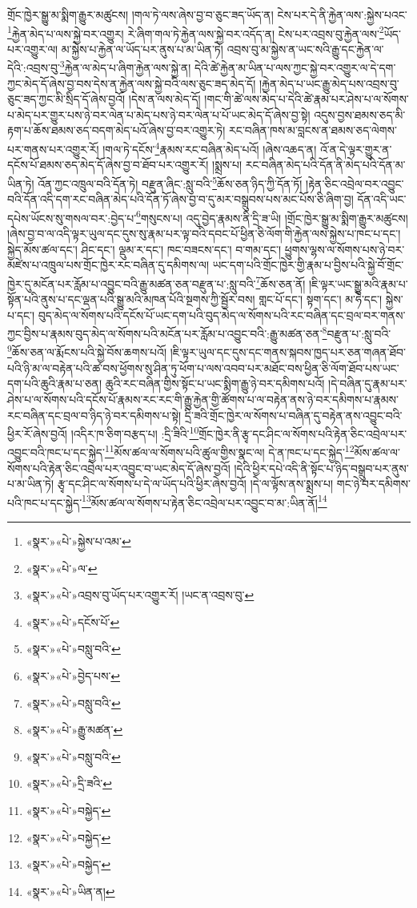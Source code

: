 གྲོང་ཁྱེར་སྒྱུ་མ་སྨིག་རྒྱུར་མཚུངས། །གལ་ཏེ་ལས་ཞེས་བྱ་བ་ཅུང་ཟད་ཡོད་ན། ངེས་པར་དེ་ནི་རྐྱེན་ལས་:སྐྱེས་པའང་\footnote{«སྣར་»«པེ་»སྐྱེས་པ་འམ་}རྐྱེན་མེད་པ་ལས་སྐྱེ་བར་འགྱུར། རེ་ཞིག་གལ་ཏེ་རྐྱེན་ལས་སྐྱེ་བར་འདོད་ན། ངེས་པར་འབྲས་བུ་རྐྱེན་ལས་\footnote{«སྣར་»«པེ་»ལ་}ཡོད་པར་འགྱུར་ལ། མ་སྐྱེས་པ་རྐྱེན་ལ་ཡོད་པར་ནུས་པ་མ་ཡིན་ཏེ། འབྲས་བུ་མ་སྐྱེས་ན་ཡང་སའི་རྒྱུ་དང་རྐྱེན་ལ་དེའི་:འབྲས་བུ་\footnote{«སྣར་»«པེ་»འབྲས་བུ་ཡོད་པར་འགྱུར་རོ། །ཡང་ན་འབྲས་བུ་}རྐྱེན་ལ་མེད་པ་ཞིག་རྐྱེན་ལས་སྐྱེ་ན། དེའི་ཚེ་རྐྱེན་མ་ཡིན་པ་ལས་ཀྱང་སྐྱེ་བར་འགྱུར་ལ་དེ་དག་ཀྱང་མེད་དོ་ཞེས་བྱ་བས་དེས་ན་རྐྱེན་ལས་སྐྱེ་བའི་ལས་ཅུང་ཟད་མེད་དོ། །རྐྱེན་མེད་པ་ཡང་རྒྱུ་མེད་པས་འབྲས་བུ་ཅུང་ཟད་ཀྱང་མི་སྲིད་དོ་ཞེས་བྱའོ། །དེས་ན་ལས་མེད་དོ། །གང་གི་ཚེ་ལས་མེད་པ་དེའི་ཚེ་རྣམ་པར་ཤེས་པ་ལ་སོགས་པ་མེད་པར་གྱུར་པས་ཉེ་བར་ལེན་པ་མེད་པས་ཉེ་བར་ལེན་པ་པོ་ཡང་མེད་དོ་ཞེས་བྱ་སྟེ། འདུས་བྱས་ཐམས་ཅད་མི་རྟག་པ་ཆོས་ཐམས་ཅད་བདག་མེད་པའོ་ཞེས་བྱ་བར་འགྱུར་ཏེ། རང་བཞིན་ཁས་མ་བླངས་ན་ཐམས་ཅད་ལེགས་པར་གནས་པར་འགྱུར་རོ། །གལ་ཏེ་དངོས་\footnote{«སྣར་»«པེ་»དངོས་པོ་}རྣམས་རང་བཞིན་མེད་པའོ། །ཞེས་འཆད་ན། འོ་ན་དེ་ལྟར་གྱུར་ན་དངོས་པོ་ཐམས་ཅད་མེད་དོ་ཞེས་བྱ་བ་ཐོབ་པར་འགྱུར་རོ། །སྨྲས་པ། རང་བཞིན་མེད་པའི་དོན་ནི་མེད་པའི་དོན་མ་ཡིན་ཏེ། འོན་ཀྱང་འཁྲུལ་བའི་དོན་ཏེ། བརྫུན་ཞིང་:སླུ་བའི་\footnote{«སྣར་»«པེ་»བསླུ་བའི་}ཆོས་ཅན་ཉིད་ཀྱི་དོན་ཏོ། །རྟེན་ཅིང་འབྲེལ་བར་འབྱུང་བའི་དོན་འདི་དག་རང་བཞིན་མེད་པའི་དོན་ཏོ་ཞེས་བྱ་བ་དུ་མར་བསྒྲུབས་པས་མང་པོས་ཅི་ཞིག་བྱ། དོན་འདི་ཡང་དཔེས་ཡོངས་སུ་གསལ་བར་:བྱེད་པ་\footnote{«སྣར་»«པེ་»བྱེད་པས་}གསུངས་པ། འདུ་བྱེད་རྣམས་ནི་དྲི་ཟ་ཡི། །གྲོང་ཁྱེར་སྒྱུ་མ་སྨིག་རྒྱུར་མཚུངས། །ཞེས་བྱ་བ་ལ་འདི་ལྟར་ཡུལ་དང་དུས་སུ་རྣམ་པར་ལྟ་བའི་དབང་པོ་ཕྱིན་ཅི་ལོག་གི་རྐྱེན་ལས་སྐྱེས་པ་ཁང་པ་དང་། སྐྱེད་མོས་ཚལ་དང་། ཤིང་དང་། ལྡུམ་ར་དང་། ཁང་བཟངས་དང་། བ་གམ་དང་། ཕྱུགས་ལྷས་ལ་སོགས་པས་ཉེ་བར་མཛེས་པ་འཁྲུལ་པས་གྲོང་ཁྱེར་རང་བཞིན་དུ་དམིགས་ལ། ཡང་དག་པའི་གྲོང་ཁྱེར་གྱི་རྣམ་པ་བྱིས་པའི་སྐྱེ་བོ་གྲོང་ཁྱེར་དུ་མངོན་པར་རློམ་པ་འབྱུང་བའི་རྒྱུ་མཚན་ཅན་བརྫུན་པ་:སླུ་བའི་\footnote{«སྣར་»«པེ་»བསླུ་བའི་}ཆོས་ཅན་ནོ། །ཇི་ལྟར་ཡང་སྒྱུ་མའི་རྣམ་པ་སྟོན་པའི་ནུས་པ་དང་ལྡན་པའི་སྒྱུ་མའི་མཁན་པོའི་སྔགས་ཀྱི་སྦྱོར་བས། གླང་པོ་དང་། སྟག་དང་། མ་ཧེ་དང་། སྐྱེས་པ་དང་། བུད་མེད་ལ་སོགས་པའི་དངོས་པོ་ཡང་དག་པའི་བུད་མེད་ལ་སོགས་པའི་རང་བཞིན་དང་བྲལ་བར་གནས་ཀྱང་བྱིས་པ་རྣམས་བུད་མེད་ལ་སོགས་པའི་མངོན་པར་རློམ་པ་འབྱུང་བའི་:རྒྱུ་མཚན་ཅན་\footnote{«སྣར་»«པེ་»རྒྱུ་མཚན་}བརྫུན་པ་:སླུ་བའི་\footnote{«སྣར་»«པེ་»བསླུ་བའི་}ཆོས་ཅན་ལ་རྨོངས་པའི་སྐྱེ་བོས་ཆགས་པའོ། །ཇི་ལྟར་ཡུལ་དང་དུས་དང་གནས་སྐབས་ཁྱད་པར་ཅན་གཞན་ཐོབ་པའི་ཉི་མ་ལ་བརྟེན་པའི་ཚ་བས་ཕྱོགས་སུ་ཤིན་ཏུ་ཕོག་པ་ལས་འབབ་པར་མཐོང་བས་ཕྱིན་ཅི་ལོག་ཐོབ་པས་ཡང་དག་པའི་ཆུའི་རྣམ་པ་ཅན། ཆུའི་རང་བཞིན་གྱིས་སྟོང་པ་ཡང་སྨིག་རྒྱུ་ཉེ་བར་དམིགས་པའོ། །དེ་བཞིན་དུ་རྣམ་པར་ཤེས་པ་ལ་སོགས་པའི་དངོས་པོ་རྣམས་རང་རང་གི་རྒྱུ་རྐྱེན་གྱི་ཚོགས་པ་ལ་བརྟེན་ནས་ཉེ་བར་དམིགས་པ་རྣམས་རང་བཞིན་དང་བྲལ་བ་ཉིད་ཉེ་བར་དམིགས་པ་སྟེ། དྲི་ཟའི་གྲོང་ཁྱེར་ལ་སོགས་པ་བཞིན་དུ་བརྟེན་ནས་འབྱུང་བའི་ཕྱིར་རོ་ཞེས་བྱའོ། །འདིར་ཁ་ཅིག་བརྩད་པ། :དྲི་ཟིའི་\footnote{«སྣར་»«པེ་»དྲི་ཟའི་}གྲོང་ཁྱེར་ནི་རྩྭ་དང་ཤིང་ལ་སོགས་པའི་རྟེན་ཅིང་འབྲེལ་པར་འབྱུང་བའི་ཁང་པ་དང་སྐྱེད་\footnote{«སྣར་»«པེ་»བསྐྱེད་}མོས་ཚལ་ལ་སོགས་པའི་ཚུལ་གྱིས་སྣང་ལ། དེ་ན་ཁང་པ་དང་སྐྱེད་\footnote{«སྣར་»«པེ་»བསྐྱེད་}མོས་ཚལ་ལ་སོགས་པའི་རྟེན་ཅིང་འབྲེལ་པར་འབྱུང་བ་ཡང་མེད་དོ་ཞེས་བྱའོ། །དེའི་ཕྱིར་དཔེ་འདི་ནི་སྟོང་པ་ཉིད་བསྒྲུབ་པར་ནུས་པ་མ་ཡིན་ཏེ། རྩྭ་དང་ཤིང་ལ་སོགས་པ་དེ་ལ་ཡོད་པའི་ཕྱིར་ཞེས་བྱའོ། །དེ་ལ་ལྟོས་ནས་སྨྲས་པ། གང་ཉེ་བར་དམིགས་པའི་ཁང་པ་དང་སྐྱེད་\footnote{«སྣར་»«པེ་»བསྐྱེད་}མོས་ཚལ་ལ་སོགས་པ་རྟེན་ཅིང་འབྲེལ་པར་འབྱུང་བ་མ་:ཡིན་ནོ།\footnote{«སྣར་»«པེ་»ཡིན་ན།} 